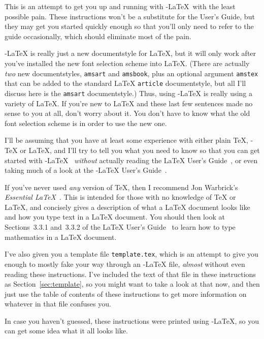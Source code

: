 This is an attempt to get you up and running with \AmS-\LaTeX\ with
the least possible pain.  These instructions won't be a substitute
for the User's Guide, but they may get you started quickly enough so
that you'll only need to refer to the guide occasionally, which
should eliminate most of the pain.



\AmS-\LaTeX{} is really just a new documentstyle for \LaTeX,
but it will only work after you've installed the new font selection
scheme into \LaTeX.  (There are actually {\em two\/} new
documentstyles, \verb"amsart" and \verb"amsbook", plus an optional
argument \verb"amstex" that can be added to the standard \LaTeX{}
\verb"article" documentstyle, but all I'll discuss here is the
\verb"amsart" documentstyle.)  Thus, using \AmS-\LaTeX{} is really
using a variety of \LaTeX.  If you're new to \LaTeX{} and these last
few sentences made no sense to you at all, don't worry about it.  You
don't have to know what the old font selection scheme is in order to
use the new one.


I'll be assuming that you have at least some experience with either
plain \TeX, \AmS-\TeX{} or \LaTeX, and I'll try to tell you what
you need to know so that you can get started with \AmS-\LaTeX\ {\em
without\/} actually reading the \LaTeX{} User's Guide~\cite{latex},
or even taking much of a look at the \AmS-\LaTeX{} User's
Guide~\cite{amslatexusersguide}.


If you've never used {\em any\/} version of \TeX, then I recommend
Jon Warbrick's {\em Essential \LaTeX\/}~\cite{essential}. This is
intended for those with no knowledge of \TeX{} or \LaTeX, and
concisely gives a description of what a \LaTeX{} document looks like
and how you type text in a \LaTeX{} document.  You should then look
at Sections~3.3.1 and~3.3.2 of the \LaTeX{} User's Guide~\cite[pages
41--47]{latex} to learn how to type mathematics in a \LaTeX{}
document.

I've also given you a template file \verb"template.tex", which is an
attempt to give you enough to mostly fake your way through an
\AmS-\LaTeX{} file, {\em almost\/} without even reading these
instructions.  I've included the text of that file in these
instructions as Section~\ref{sec:template}, so you might want to take a
look at that now, and then just use the table of contents of these
instructions to get more information on whatever in that file
confuses you.

In case you haven't guessed, these instructions were printed using
\AmS-\LaTeX, so you can get some idea what it all looks like.



